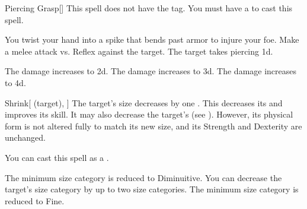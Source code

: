 \lowercase{\hypertarget{spell:Piercing Grasp}{}}\label{spell:Piercing Grasp}
\begin{freeability}[Rank 2]{\hypertarget{spell:Piercing Grasp}{Piercing Grasp}}[]
This spell does not have the  tag.
You must have a  to cast this spell.

You twist your hand into a spike that bends past armor to injure your foe.
Make a melee attack vs. Reflex against the target.
\hit The target takes piercing  \plus1d.

\rankline
{} The damage increases to  \plus2d.
 The damage increases to  \plus3d.
 The damage increases to  \plus4d.
\end{freeability}
\vspace{0.25em}



\lowercase{\hypertarget{spell:Shrink}{}}\label{spell:Shrink}
\begin{attuneability}[Rank 2]{\hypertarget{spell:Shrink}{Shrink}}[ (target), ]
The target's size decreases by one .
This decreases its  and improves its  skill.
It may also decrease the target's  (see ).
However, its physical form is not altered fully to match its new size, and its Strength and Dexterity are unchanged.

You can cast this spell as a .

\rankline
{} The minimum size category is reduced to Diminuitive.
 You can decrease the target's size category by up to two size categories.
 The minimum size category is reduced to Fine.
\end{attuneability}
\vspace{0.25em}




